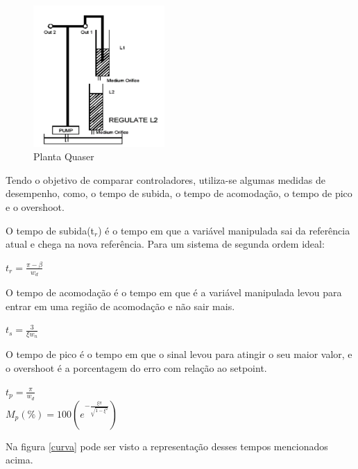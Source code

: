 \documentclass[a4paper,12pt]{article}
\begin{document}
\begin{figure}[h]
\centering
\includegraphics[width=5cm]{fotosLab3/planta.png}
\caption{Planta Quaser}
\label{quaser}
\end{figure}

\hspace{4ex}Tendo o objetivo de comparar controladores, utiliza-se algumas medidas de desempenho, como, o tempo de subida, o tempo de acomodação, o tempo de pico e o overshoot.

\hspace{4ex}O tempo de subida(t$_r$) é o tempo em que a variável manipulada sai da referência atual e chega na nova referência. Para um sistema de segunda ordem ideal:

\begin{center}
$ t_r = \frac{\pi - \beta}{w_d} $
\end{center} 

\hspace{4ex}O tempo de acomodação é o tempo em que é a variável manipulada levou para entrar em uma região de acomodação e não sair mais.

\begin{center}
$ t_s=\frac{3}{\xi w_n} $
\end{center}

\hspace{4ex}O tempo de pico é o tempo em que o sinal levou para atingir o seu maior valor, e o overshoot é a porcentagem do erro com relação ao setpoint.

\begin{center}
$ t_p=\frac{\pi}{w_d} $\\
$ M_p(\%)=100( e^{- \frac{\xi\pi}{\sqrt{1-\xi^{2}}} } ) $
\end{center}

Na figura \ref{curva} pode ser visto a representação desses tempos mencionados acima.
\end{document}

